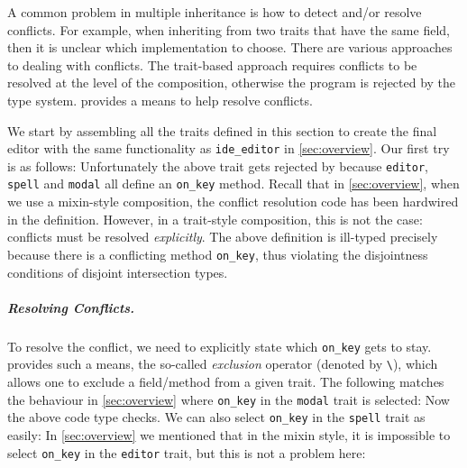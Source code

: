A common problem in multiple inheritance is how to detect and/or resolve conflicts. For example, when
inheriting from two traits that have the same field, then it is unclear which
implementation to choose. There are various approaches to dealing with
conflicts. The trait-based approach requires conflicts to be resolved at the
level of the composition, otherwise the program is rejected by
the type system. \name provides a means to help resolve conflicts.

We start by assembling all the traits defined in this section
to create the final editor with the same functionality as
\lstinline{ide_editor} in \cref{sec:overview}. Our first try is as follows:
Unfortunately the above trait gets rejected by \name because
\lstinline{editor}, \lstinline{spell} and \lstinline{modal} all define an \lstinline{on_key} method.
Recall that in \cref{sec:overview}, when we use a mixin-style composition,
the conflict resolution code has been hardwired in the definition.
However, in a trait-style composition, this is not the case: conflicts must be resolved \emph{explicitly}.
The
above definition is ill-typed precisely because there is a conflicting
method \lstinline{on_key}, thus violating the disjointness conditions
of disjoint intersection types.

\subparagraph{Resolving Conflicts.}
To resolve the conflict, we need to explicitly state which
\lstinline{on_key} gets to stay. \name provides such a means, the so-called
\emph{exclusion} operator (denoted by \lstinline$\$), which allows one to
exclude a field/method from a given trait. The following matches the behaviour
in \cref{sec:overview} where \lstinline{on_key} in the \lstinline{modal} trait
is selected:
Now the above code type checks. We can also select \lstinline{on_key} in the \lstinline{spell} trait as easily:
In \cref{sec:overview} we mentioned that in the mixin style, it is impossible
to select \lstinline{on_key} in the \lstinline{editor} trait, but this is not a problem here:





